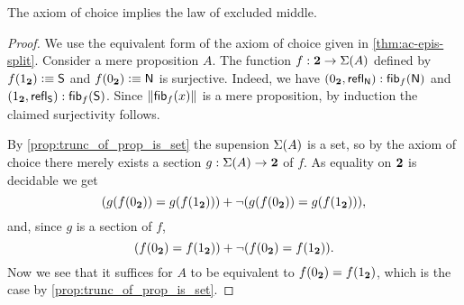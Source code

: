 \begin{thm}[Diaconescu]\label{thm:1surj_to_surj_to_pem}
  The axiom of choice implies the law of excluded middle.
\end{thm}

\begin{proof}
We use the equivalent form of the axiom of choice given in \autoref{thm:ac-epis-split}.
Consider a mere proposition $A$.
The function $f:\mathbf{2}\to\Sigma(A)$ defined by
$f({1_{\mathbf{2}}}) \vcentcolon\equiv \mathsf{S}$ and $f({0_{\mathbf{2}}}) \vcentcolon\equiv \mathsf{N}$
is surjective.
Indeed, we have
${({0_{\mathbf{2}}},\mathsf{refl}_{\mathsf{N}})} : {\mathsf{fib}}_{f}(\mathsf{N})$
and ${({1_{\mathbf{2}}},\mathsf{refl}_{\mathsf{S}})} :{\mathsf{fib}}_{f}(\mathsf{S})$.
Since $\mathopen{}\left\Vert {\mathsf{fib}}_{f}(x)\right\Vert_{}\mathclose{}$ is a mere proposition, by induction the claimed surjectivity follows.

By \autoref{prop:trunc_of_prop_is_set} the supension $\Sigma(A)$
is a set, so by the axiom of choice there merely exists a
section $g: \Sigma(A) \to \mathbf{2}$ of $f$.
As equality on $\mathbf{2}$ is decidable we get
\begin{equation*}
 (g(f({0_{\mathbf{2}}}))= g(f({1_{\mathbf{2}}}))) +
 \lnot (g(f({0_{\mathbf{2}}}))= g(f({1_{\mathbf{2}}}))),
\end{equation*}
and, since $g$ is a section of $f$,
\begin{equation*}
(f({0_{\mathbf{2}}}) = f({1_{\mathbf{2}}})) +
\lnot (f({0_{\mathbf{2}}}) = f({1_{\mathbf{2}}})).
\end{equation*}
Now we see that it suffices for $A$ to be equivalent to
$f({0_{\mathbf{2}}}) = f({1_{\mathbf{2}}})$, which is the case by \autoref{prop:trunc_of_prop_is_set}.
\end{proof}




